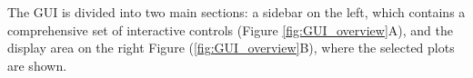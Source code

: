 \documentclass[article]{ajs}
\begin{document}

The GUI is divided into two main sections: a sidebar on the left, which contains a comprehensive set of interactive controls (Figure \ref{fig:GUI_overview}A), and the display area on the right Figure (\ref{fig:GUI_overview}B), where the selected plots are shown.
\end{document}
